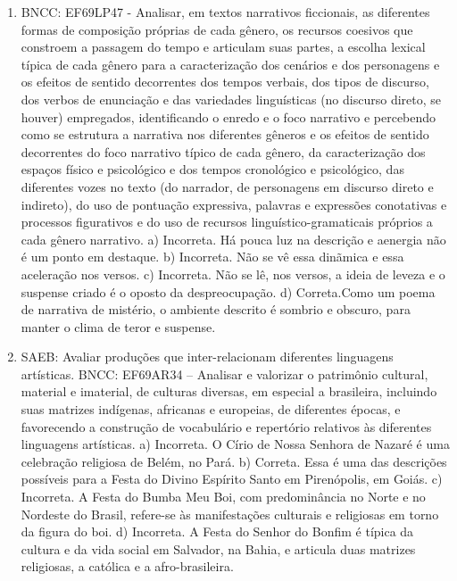 \begin{enumerate}
\item
BNCC: EF69LP47 - Analisar, em textos narrativos ficcionais, as
diferentes formas de composição próprias de cada gênero, os recursos
coesivos que constroem a passagem do tempo e articulam suas partes, a
escolha lexical típica de cada gênero para a caracterização dos cenários
e dos personagens e os efeitos de sentido decorrentes dos tempos
verbais, dos tipos de discurso, dos verbos de enunciação e das
variedades linguísticas (no discurso direto, se houver) empregados,
identificando o enredo e o foco narrativo e percebendo como se estrutura
a narrativa nos diferentes gêneros e os efeitos de sentido decorrentes
do foco narrativo típico de cada gênero, da caracterização dos espaços
físico e psicológico e dos tempos cronológico e psicológico, das
diferentes vozes no texto (do narrador, de personagens em discurso
direto e indireto), do uso de pontuação expressiva, palavras e
expressões conotativas e processos figurativos e do uso de recursos
linguístico-gramaticais próprios a cada gênero narrativo.
a) Incorreta. Há pouca luz na descrição e aenergia não é um ponto em
destaque. b) Incorreta. Não se vê essa dinãmica e essa aceleração nos
versos. c) Incorreta. Não se lê, nos versos, a ideia de leveza e o
suspense criado é o oposto da despreocupação. d) Correta.Como um poema
de narrativa de mistério, o ambiente descrito é sombrio e obscuro, para
manter o clima de teror e suspense.

\item
SAEB: Avaliar produções que inter-relacionam diferentes linguagens
artísticas.
BNCC: EF69AR34 -- Analisar e valorizar o patrimônio cultural, material e
imaterial, de culturas diversas, em especial a brasileira, incluindo
suas matrizes indígenas, africanas e europeias, de diferentes épocas, e
favorecendo a construção de vocabulário e repertório relativos às
diferentes linguagens artísticas.
a) Incorreta. O Círio de Nossa Senhora de Nazaré é uma celebração
religiosa de Belém, no Pará.
b) Correta. Essa é uma das descrições possíveis para a Festa do Divino
Espírito Santo em Pirenópolis, em Goiás.
c) Incorreta. A Festa do Bumba Meu Boi, com predominância no Norte e no
Nordeste do Brasil, refere-se às manifestações culturais e religiosas em
torno da figura do boi.
d) Incorreta. A Festa do Senhor do Bonfim é típica da cultura e da vida
social em Salvador, na Bahia, e articula duas matrizes religiosas, a
católica e a afro-brasileira.


\end{enumerate}
